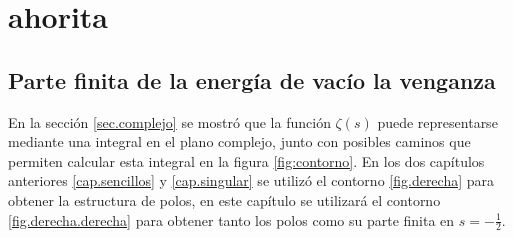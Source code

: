 \chapter{ahorita}

\section{Parte finita de la energía de vacío la venganza }

En la sección \ref{sec.complejo} se mostró que la función $\zeta (s)$ puede representarse mediante una integral en el plano complejo, junto con posibles caminos que permiten calcular esta integral en la figura \ref{fig:contorno}. En los dos capítulos anteriores \ref{cap.sencillos}  y \ref{cap.singular} se utilizó el contorno \ref{fig.derecha} para obtener la estructura de polos, en este capítulo se utilizará el contorno \ref{fig.derecha.derecha} para obtener tanto los polos como su parte finita en $s = - \frac{1}{2}$.

